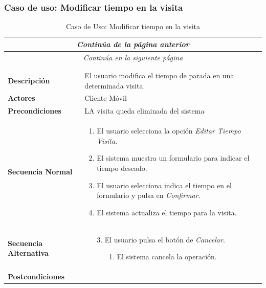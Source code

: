 \newpage
\subsubsection*{Caso de uso: Modificar tiempo en la visita }
\begin{longtable}{| p{4cm} | p{10cm} |}
\endfirsthead
\multicolumn{2}{c}{\textit{Continúa de la página anterior}}\\[12pt]
\hline
\endhead
\hline
\multicolumn{2}{c}{\textit{Continúa en la siguiente página}} \\
\endfoot
\hline
\caption{Caso de Uso: Modificar tiempo en la visita}\label{fig:1}\\
\endlastfoot


\hline
\multicolumn{2}{|c|}{\textbf{CU$<$17$>$ - Modificar Tiempo en la Visita}} \\

\hline
\textbf{Descripción} &
El usuario modifica el tiempo de parada en una determinada visita.\\

\hline
\textbf{Actores} &
Cliente Móvil\\

\hline
\textbf{Precondiciones} &
LA visita queda eliminada del sistema\\

\hline
\textbf{Secuencia Normal} &\mbox{}\par\vspace{-\baselineskip}
\begin{enumerate}[leftmargin=0.7cm, topsep=0.1cm]
\item El usuario selecciona la opción \textit{Editar Tiempo Visita}.
\item El sistema muestra un formulario para indicar el tiempo deseado.
\item El usuario selecciona indica el tiempo en el formulario y pulsa en \textit{Confirmar}.
\item El sistema actualiza el tiempo para la visita.

\end{enumerate}


\\
\hline
\textbf{Secuencia Alternativa} &\mbox{}\par\vspace{-\baselineskip}
\begin{enumerate}[leftmargin=0.9cm, topsep=0.1cm]
\item[3.] El usuario pulsa el botón de \textit{Cancelar}.
	\begin{itemize}
	\item[1.] El sistema cancela la operación.
	\end{itemize}
\end{enumerate}
\\

\hline
\textbf{Postcondiciones} & \\
\hline
\end{longtable}



